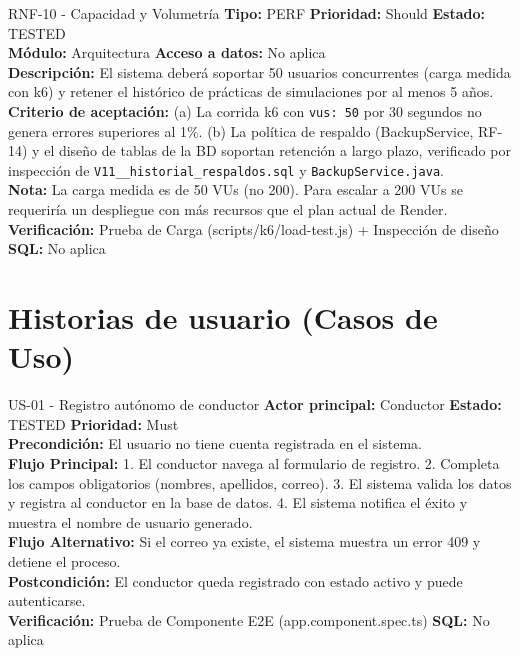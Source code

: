 \documentclass[11pt,a4paper]{article}
\begin{document}
\begin{requisito}{RNF-10 - Capacidad y Volumetría}
    \textbf{Tipo:} PERF \quad \textbf{Prioridad:} Should \quad \textbf{Estado:} TESTED \\[0.2cm]
    \textbf{Módulo:} Arquitectura \quad \textbf{Acceso a datos:} No aplica \\[0.2cm]
    \textbf{Descripción:} El sistema deberá soportar 50 usuarios concurrentes (carga medida con k6) y retener el histórico de prácticas de simulaciones por al menos 5 años. \\[0.2cm]
    \textbf{Criterio de aceptación:} (a) La corrida k6 con \texttt{vus: 50} por 30 segundos no genera errores superiores al 1\%. (b) La política de respaldo (BackupService, RF-14) y el diseño de tablas de la BD soportan retención a largo plazo, verificado por inspección de \texttt{V11\_\_historial\_respaldos.sql} y \texttt{BackupService.java}. \\[0.2cm]
    \textbf{Nota:} La carga medida es de 50 VUs (no 200). Para escalar a 200 VUs se requeriría un despliegue con más recursos que el plan actual de Render. \\[0.2cm]
    \textbf{Verificación:} Prueba de Carga (scripts/k6/load-test.js) + Inspección de diseño \quad \textbf{SQL:} No aplica
\end{requisito}

\newpage
\section{Historias de usuario (Casos de Uso)}

\begin{requisito}{US-01 - Registro autónomo de conductor}
    \textbf{Actor principal:} Conductor \quad \textbf{Estado:} TESTED \quad \textbf{Prioridad:} Must\\[0.2cm]
    \textbf{Precondición:} El usuario no tiene cuenta registrada en el sistema.\\[0.2cm]
    \textbf{Flujo Principal:} 1. El conductor navega al formulario de registro. 2. Completa los campos obligatorios (nombres, apellidos, correo). 3. El sistema valida los datos y registra al conductor en la base de datos. 4. El sistema notifica el éxito y muestra el nombre de usuario generado. \\[0.2cm]
    \textbf{Flujo Alternativo:} Si el correo ya existe, el sistema muestra un error 409 y detiene el proceso.\\[0.2cm]
    \textbf{Postcondición:} El conductor queda registrado con estado activo y puede autenticarse. \\[0.2cm]
    \textbf{Verificación:} Prueba de Componente E2E (app.component.spec.ts) \quad \textbf{SQL:} No aplica
\end{requisito}
\end{document}
